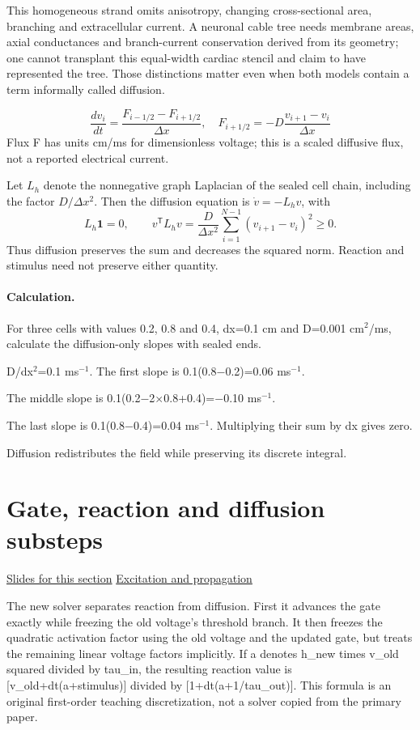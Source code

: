 \documentclass[11pt,letterpaper]{article}
\theoremstyle{definition}\newtheorem{definition}{Definition}\newtheorem{example}{Example}
\numberwithin{equation}{section}
\begin{document}
This homogeneous strand omits anisotropy, changing cross-sectional area, branching and extracellular current. A neuronal cable tree needs membrane areas, axial conductances and branch-current conservation derived from its geometry; one cannot transplant this equal-width cardiac stencil and claim to have represented the tree. Those distinctions matter even when both models contain a term informally called diffusion.

\[
\frac{d v_i}{dt}=\frac{F_{i-1/2}-F_{i+1/2}}{\Delta x},\quad F_{i+1/2}=-D\frac{v_{i+1}-v_i}{\Delta x}
\]
Flux F has units cm/ms for dimensionless voltage; this is a scaled diffusive flux, not a reported electrical current.

Let $L_h$ denote the nonnegative graph Laplacian of the sealed cell chain, including the factor $D/\Delta x^2$. Then the diffusion equation is $\dot v=-L_hv$, with
\[
 L_h\boldsymbol1=0,\qquad
 v^{\mathsf T}L_hv=\frac D{\Delta x^2}\sum_{i=1}^{N-1}(v_{i+1}-v_i)^2\ge0.
\]
Thus diffusion preserves the sum and decreases the squared norm. Reaction and stimulus need not preserve either quantity.

\paragraph{Calculation.} For three cells with values 0.2, 0.8 and 0.4, dx=0.1 cm and D=0.001 cm\ensuremath{^{2}}/ms, calculate the diffusion-only slopes with sealed ends.

D/dx\ensuremath{^{2}}=0.1 ms\ensuremath{^{-1}}. The first slope is 0.1(0.8\ensuremath{-}0.2)=0.06 ms\ensuremath{^{-1}}.

The middle slope is 0.1(0.2\ensuremath{-}2\ensuremath{\times}0.8+0.4)=\ensuremath{-}0.10 ms\ensuremath{^{-1}}.

The last slope is 0.1(0.8\ensuremath{-}0.4)=0.04 ms\ensuremath{^{-1}}. Multiplying their sum by dx gives zero.

Diffusion redistributes the field while preserving its discrete integral.
\section{Gate, reaction and diffusion substeps}
\hypertarget{note-gate-reaction-and-diffusion-substeps}{}\label{note:gate-reaction-and-diffusion-substeps}
{\small \href{slides.html\#frame=exact-frozen-branch-gate-evolution\&step=1}{Slides for this section} \quad \href{../modules/animations/excitable-wave.html}{Excitation and propagation}}\par
The new solver separates reaction from diffusion. First it advances the gate exactly while freezing the old voltage's threshold branch. It then freezes the quadratic activation factor using the old voltage and the updated gate, but treats the remaining linear voltage factors implicitly. If a denotes h\_new times v\_old squared divided by tau\_in, the resulting reaction value is [v\_old+dt(a+stimulus)] divided by [1+dt(a+1/tau\_out)]. This formula is an original first-order teaching discretization, not a solver copied from the primary paper.
\end{document}
